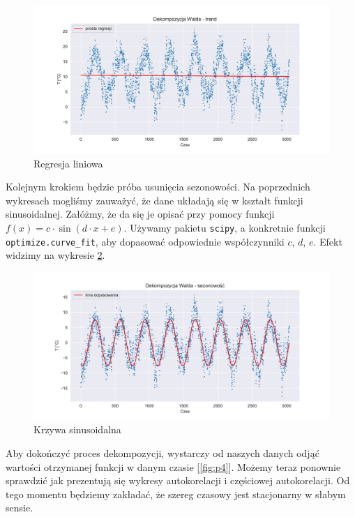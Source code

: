 \documentclass{article}
\theoremstyle{break}
\newcommand{\code}[1]{\colorbox{light-gray}{\texttt{#1}}}
\begin{document}
\begin{figure}[H]
	\begin{center}
		\includegraphics[scale=0.63]{plot2.pdf}
		\caption{Regresja liniowa}
		\label{fig:p2}
	\end{center}
\end{figure}

Kolejnym krokiem będzie próba usunięcia sezonowości. Na poprzednich wykresach mogliśmy zauważyć, że dane układają się w kształt funkcji sinusoidalnej. Załóżmy, że da się je opisać przy pomocy funkcji $f(x) = c\cdot\sin(d\cdot x+e)$. Używamy pakietu \code{scipy}, a konkretnie funkcji \code{optimize.curve\_fit}, aby dopasować odpowiednie współczynniki $c$, $d$, $e$. Efekt widzimy na wykresie \ref{fig:p3}.

\begin{figure}[H]
	\begin{center}
		\includegraphics[scale=0.63]{plot3.pdf}
		\caption{Krzywa sinusoidalna}
		\label{fig:p3}
	\end{center}
\end{figure}

Aby dokończyć proces dekompozycji, wystarczy od naszych danych odjąć wartości otrzymanej funkcji w danym czasie [\ref{fig:p4}]. Możemy teraz ponownie sprawdzić jak prezentują się wykresy autokorelacji i częściowej autokorelacji. Od tego momentu będziemy zakładać, że szereg czasowy jest stacjonarny w słabym sensie.
\end{document}
